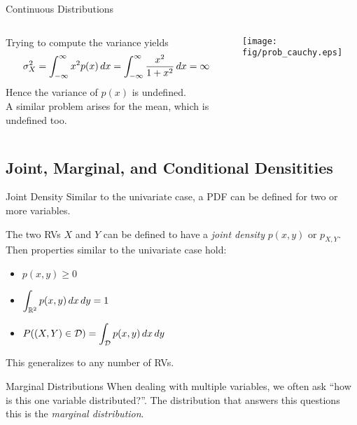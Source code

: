 {\begin{frame}{Continuous Distributions}
\begin{columns}[onlytextwidth]
\begin{column}{0.55\textwidth}
                Trying to compute the variance yields
                $$\sigma_X^2 = \int_{-\infty}^\infty x^2p(x) \mathop{dx}
                    = \int_{-\infty}^\infty \frac{x^2}{1+x^2} \mathop{dx} = \infty
                $$
                Hence the variance of $p(x)$ is undefined.\\[3mm]

                A similar problem arises for the mean, which is undefined too.
            \end{column}
            \begin{column}{0.45\textwidth}
                \begin{center}
                    \texttt{[image: fig/prob\_cauchy.eps]}
                \end{center}
            \end{column}
        \end{columns}


    \end{frame}

    \subsection{Joint, Marginal, and Conditional Densitities}

    \begin{frame}{Joint Density}
        Similar to the univariate case, a PDF can be defined for two or more variables.

        The two RVs $X$ and $Y$ can be defined to have a \emph{joint density} $p(x, y)$ or $p_{X, Y}$.
        Then properties similar to the univariate case hold:
        \begin{itemize}
            \item $\displaystyle p(x, y) \ge 0$
            \item $\displaystyle \int _ {\mathbb{R}^2} p(x, y) \mathop{dx} \mathop{dy} = 1$
            \item $\displaystyle P((X, Y) \in \mathcal{D}) = \int _ {\mathcal{D}} p(x, y) \mathop{dx} \mathop{dy}$
        \end{itemize}

        This generalizes to any number of RVs.
    \end{frame}

    \begin{frame}{Marginal Distributions}
        When dealing with multiple variables, we often ask ``how is this one variable distributed?''.
        The distribution that answers this questions this is the \emph{marginal distribution}.


\end{frame}}
